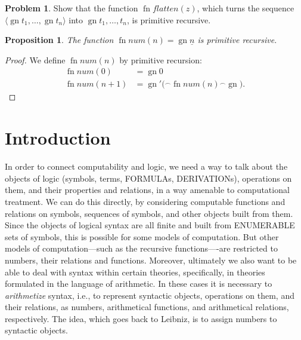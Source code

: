 \documentclass[10pt,a4paper]{article}
\newcommand*{\olup}[1]{\MakeUppercase{#1}}
\theoremstyle{plain}
\newtheorem{prop}[thm]{Proposition}
\theoremstyle{definition}
\newtheorem{prob}{Problem}[section]
\theoremstyle{remark}
\newcommand*{\olfileid}[3]{}
\newcommand*{\olsection}[1]{\section*{#1}}
\newcommand*{\ollabel}[1]{\label{#1}}
\providecommand{\Obj}{}
\providecommand{\tuple}[1]{\langle #1 \rangle}
\providecommand{\num}[1]{\underline{#1}}
\providecommand{\concat}{\mathbin{{}^\frown}}
\providecommand{\Gn}{\operatorname{gn}}
\providecommand{\fn}{\operatorname{fn}}
\begin{document}
\begin{prob}
Show that the function $\fn{flatten}(z)$, which turns the sequence
$\tuple{\Gn{t_1}, \dots, \Gn{t_n}}$ into $\Gn{t_1, \dots, t_n}$, is
primitive recursive.
\end{prob}

\begin{prop}\ollabel{prop:num-primrec}
  The function $\fn{num}(n) = \Gn{\num{n}}$ is primitive recursive.
\end{prop}

\begin{proof}
  We define $\fn{num}(n)$ by primitive recursion:
  \begin{align*}
    \fn{num}(0) & = \Gn{\Obj 0}\\
    \fn{num}(n+1) & = \Gn{\prime(} \concat \fn{num}(n) \concat \Gn{)}.
  \end{align*}
\end{proof}





\olfileid{inc}{art}{int}
\olsection{Introduction}

In order to connect computability and logic, we need a way to talk
about the objects of logic (symbols, terms, \olup{formula}s,
\olup{derivation}s), operations on them, and their properties and
relations, in a way amenable to computational treatment.  We can do
this directly, by considering computable functions and relations on
symbols, sequences of symbols, and other objects built from them.
Since the objects of logical syntax are all finite and built from
\olup{enumerable} sets of symbols, this is possible for some models of
computation.  But other models of computation---such as the recursive
functions----are restricted to numbers, their relations and functions.
Moreover, ultimately we also want to be able to deal with syntax
within certain theories, specifically, in theories formulated in the
language of arithmetic.  In these cases it is necessary to
\emph{arithmetize} syntax, i.e., to represent syntactic objects,
operations on them, and their relations, as numbers, arithmetical
functions, and arithmetical relations, respectively. The idea, which
goes back to Leibniz, is to assign numbers to syntactic objects.
\end{document}
